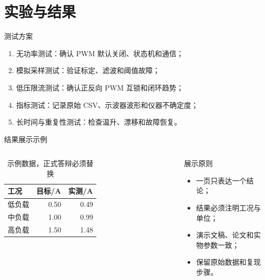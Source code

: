 \documentclass[aspectratio=169,10pt,fontset=fandol]{ctexbeamer}
\begin{document}
\section{实验与结果}
\begin{frame}{测试方案}
  \begin{enumerate}
    \item 无功率测试：确认 PWM 默认关闭、状态机和通信；
    \item 模拟采样测试：验证标定、滤波和阈值故障；
    \item 低压限流测试：确认正反向 PWM 互锁和闭环趋势；
    \item 指标测试：记录原始 CSV、示波器波形和仪器不确定度；
    \item 长时间与重复性测试：检查温升、漂移和故障恢复。
  \end{enumerate}
\end{frame}

\begin{frame}{结果展示示例}
  \begin{columns}[T]
    \begin{table}
      \centering
      \begin{tabular}{lrr}
        \toprule
        工况 & 目标/A & 实测/A \\
        \midrule
        低负载 & 0.50 & 0.49 \\
        中负载 & 1.00 & 0.99 \\
        高负载 & 1.50 & 1.48 \\
        \bottomrule
      \end{tabular}
      \caption{示例数据，正式答辩必须替换}
    \end{table}
    \begin{block}{展示原则}
      \begin{itemize}
        \item 一页只表达一个结论；
        \item 结果必须注明工况与单位；
        \item 演示文稿、论文和实物参数一致；
        \item 保留原始数据和复现步骤。
      \end{itemize}
    \end{block}
  \end{columns}
\end{frame}
\end{document}
